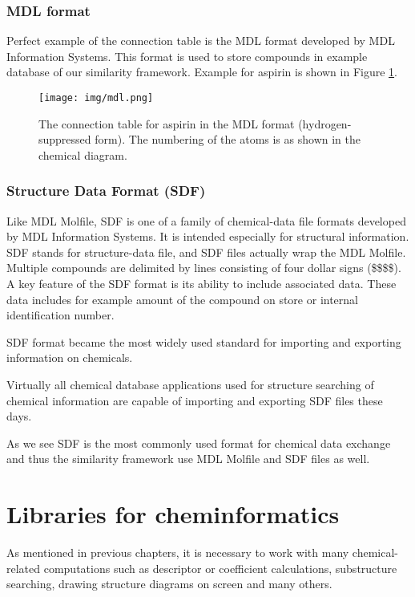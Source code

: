 \documentclass[thesis=M,english]{FITthesis}[2012/10/20]
\begin{document}
\subsubsection{MDL format}
\label{mdlFormatRef}

Perfect example of the connection table is the MDL format developed by MDL Information Systems. This format is used to store compounds in example database of our similarity framework. Example for aspirin is shown in Figure \ref{fig:mdl}.

\begin{figure}
  \centering
  \texttt{[image: img/mdl.png]}
  \caption{The connection table for aspirin in the MDL format (hydrogen-suppressed form).
The numbering of the atoms is as shown in the chemical diagram.}
  \label{fig:mdl}
\end{figure}

\subsubsection{Structure Data Format (SDF)}
Like MDL Molfile, SDF is one of a family of chemical-data file formats developed by MDL Information Systems. It is intended especially for structural information. SDF stands for structure-data file, and SDF files actually wrap the MDL Molfile. Multiple compounds are delimited by lines consisting of four dollar signs (\$\$\$\$). A key feature of the SDF format is its ability to include associated data. These data includes for example amount of the compound on store or internal identification number.

SDF format became the most widely used standard for importing and exporting information on chemicals.\cite{sdf}  

Virtually all chemical database applications used for structure searching of chemical information are capable of importing and exporting SDF files these days.\cite{sdf2}

As we see SDF is the most commonly used format for chemical data exchange and thus the similarity framework use MDL Molfile and SDF files as well.


\section{Libraries for cheminformatics}
\label{chemLibrariesRef}
As mentioned in previous chapters, it is necessary to work with many chemical-related computations such as descriptor or coefficient calculations, substructure searching, drawing structure diagrams on screen and many others.
\end{document}
